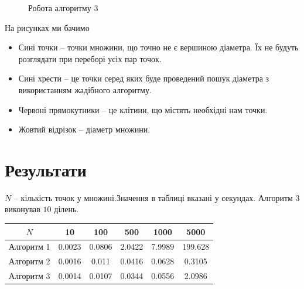 \documentclass[a4paper,12pt]{article}
\begin{document}
\begin{figure}[h!]
	\caption{Робота алгоритму 3}
	\label{fig:f3}
\end{figure}

\newpage

На рисунках ми бачимо
\begin{itemize}
	\item Сині точки -- точки множини, що точно не є вершиною діаметра. Їх не будуть розглядати при переборі усіх пар точок.
	\item Сині хрести -- це точки серед яких буде проведений пошук діаметра з використанням жадібного алгоритму.
	\item Червоні прямокутники -- це клітини, що містять необхідні нам точки.
	\item Жовтий відрізок -- діаметр множини.
\end{itemize}


\section{Результати}

$N$ -- кількість точок у множині.Значення в таблиці вказані у секундах. Алгоритм 3 виконував $10$ ділень.

\begin{tabular}{| c | c | c | c | c | c |}
	\hline
	$N$ & 10 & 100 & 500 & 1000 & 5000 \\ 
	\hline
	Алгоритм 1 & 0.0023 & 0.0806 & 2.0422 & 7.9989 & 199.628 \\
	Алгоритм 2 & 0.0016 & 0.011 & 0.0416 & 0.0628 & 0.3105 \\
	Алгоритм 3 & 0.0014 & 0.0107 & 0.0344 & 0.0556 & 2.0986 \\
	\hline
\end{tabular}
\end{document}
